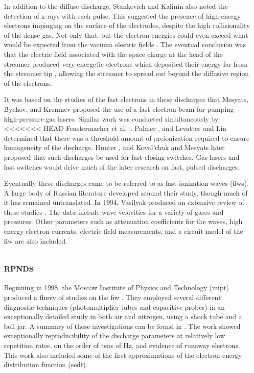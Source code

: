 In addition to the diffuse discharge, Stankevich and Kalinin also noted the
detection of x-rays with each pulse. This suggested the presence of high-energy
electrons impinging on the surface of the electrodes, despite the high
collisionality of the dense gas. Not only that, but the electron energies could
even exceed what would be expected from the vacuum electric fields
\cite{Babich1977}. The eventual conclusion was that the electric field
associated with the space charge at the head of the streamer produced very
energetic electrons which deposited their energy far from the streamer tip
\cite{Kunhardt1980, Babich1990}, allowing the streamer to spread out beyond the
diffusive region of the electrons.

It was based on the studies of the fast electrons in these discharges that
Mesyats, Bychov, and Kremnev proposed the use of a fast electron beam for
pumping high-pressure gas lasers. Similar work was conducted simultaneously by
<<<<<<< HEAD
Fenstermacher et al.~\cite{Fenstermacher1972}. Palmer \cite{Palmer1974}, and
Levatter and Lin \cite{Levatter1980} determined that there was a threshold
amount of preionization required to ensure homogeneity of the discharge. Hunter
\cite{Hunter1976}, and Koval'chuk and Mesyats \cite{Koval'chuk1976} later
proposed that such discharges be used for fast-closing switches. Gas lasers and
fast switches would drive much of the later research on fast, pulsed discharges.

Eventually these discharges came to be referred to as fast ionization waves
(\acs{fiw}s). A large body of Russian literature developed around their study,
though much of it has remained untranslated. In 1994, Vasilyak produced an
extensive review of these studies \cite{Vasilyak1994}. The data include wave
velocities for a variety of gases and pressures. Other parameters such as
attenuation coefficients for the waves, high energy electron currents, electric
field measurements, and a circuit model of the \acs{fiw} are also included.

\subsection{\textsc{rpnd}s}

Beginning in 1998, the Moscow Institute of Physics and Technology (\acs{mipt})
produced a flurry of studies on the \acs{fiw} \cite{Anikin1998, Pancheshnyi1998,
Starikovskaia1998}. They employed several different diagnostic techniques
(photomultiplier tubes and capacitive probes) in an exceptionally detailed study
in both air and nitrogen, using a shock tube and a bell jar. A summary of these
investigations can be found in \cite{Starikovskaia2001}. The work showed
exceptionally reproducibility of the discharge parameters at relatively low
repetition rates, on the order of tens of Hz, and evidence of runaway electrons.
This work also included some of the first approximations of the electron energy
distribution function (\acs{eedf}).

